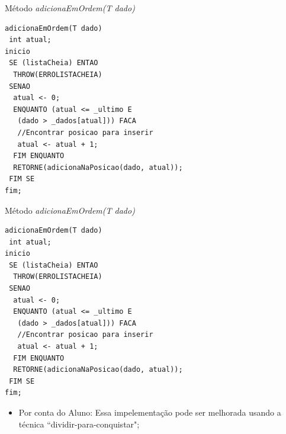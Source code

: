 \documentclass[12pt,table,xcolor={dvipsnames}]{beamer}
\begin{document}
\begin{frame}[fragile]{Método \textit{adicionaEmOrdem(T dado)}}
\begin{lstlisting}
adicionaEmOrdem(T dado)
 int atual;
inicio
 SE (listaCheia) ENTAO
  THROW(ERROLISTACHEIA)
 SENAO
  atual <- 0;
  ENQUANTO (atual <= _ultimo E
   (dado > _dados[atual])) FACA
   //Encontrar posicao para inserir
   atual <- atual + 1;
  FIM ENQUANTO
  RETORNE(adicionaNaPosicao(dado, atual));
 FIM SE
fim;
\end{lstlisting}
\end{frame}

\begin{frame}[fragile]{Método \textit{adicionaEmOrdem(T dado)}}
\begin{lstlisting}
adicionaEmOrdem(T dado)
 int atual;
inicio
 SE (listaCheia) ENTAO
  THROW(ERROLISTACHEIA)
 SENAO
  atual <- 0;
  ENQUANTO (atual <= _ultimo E
   (dado > _dados[atual])) FACA
   //Encontrar posicao para inserir
   atual <- atual + 1;
  FIM ENQUANTO
  RETORNE(adicionaNaPosicao(dado, atual));
 FIM SE
fim;
\end{lstlisting}
\begin{itemize}
\item Por conta do Aluno: Essa impelementação pode ser melhorada usando a técnica ``dividir-para-conquistar";
\end{itemize}
\end{frame}
\end{document}
